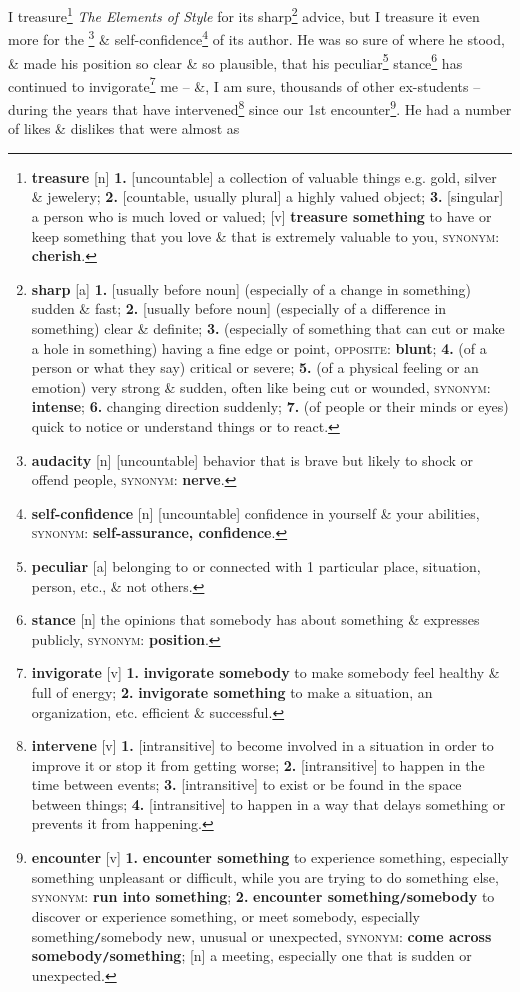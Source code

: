 \documentclass[oneside]{book}
\numberwithin{equation}{section}
\begin{document}
I treasure\footnote{\textbf{treasure} [n] \textbf{1.} [uncountable] a collection of valuable things e.g. gold, silver \& jewelery; \textbf{2.} [countable, usually plural] a highly valued object; \textbf{3.} [singular] a person who is much loved or valued; [v] \textbf{treasure something} to have or keep something that you love \& that is extremely valuable to you, \textsc{synonym}: \textbf{cherish}.} \textit{The Elements of Style} for its sharp\footnote{\textbf{sharp} [a] \textbf{1.} [usually before noun] (especially of a change in something) sudden \& fast; \textbf{2.} [usually before noun] (especially of a difference in something) clear \& definite; \textbf{3.} (especially of something that can cut or make a hole in something) having a fine edge or point, \textsc{opposite}: \textbf{blunt}; \textbf{4.} (of a person or what they say) critical or severe; \textbf{5.} (of a physical feeling or an emotion) very strong \& sudden, often like being cut or wounded, \textsc{synonym}: \textbf{intense}; \textbf{6.} changing direction suddenly; \textbf{7.} (of people or their minds or eyes) quick to notice or understand things or to react.} advice, but I treasure it even more for the \footnote{\textbf{audacity} [n] [uncountable] behavior that is brave but likely to shock or offend people, \textsc{synonym}: \textbf{nerve}.} \& self-confidence\footnote{\textbf{self-confidence} [n] [uncountable] confidence in yourself \& your abilities, \textsc{synonym}: \textbf{self-assurance, confidence}.} of its author.  He was so sure of where he stood, \& made his position so clear \& so plausible, that his peculiar\footnote{\textbf{peculiar} [a] belonging to or connected with 1 particular place, situation, person, etc., \& not others.} stance\footnote{\textbf{stance} [n] the opinions that somebody has about something \& expresses publicly, \textsc{synonym}: \textbf{position}.} has continued to invigorate\footnote{\textbf{invigorate} [v] \textbf{1.} \textbf{invigorate somebody} to make somebody feel healthy \& full of energy; \textbf{2.} \textbf{invigorate something} to make a situation, an organization, etc. efficient \& successful.} me -- \&, I am sure, thousands of other ex-students -- during the years that have intervened\footnote{\textbf{intervene} [v] \textbf{1.} [intransitive] to become involved in a situation in order to improve it or stop it from getting worse; \textbf{2.} [intransitive] to happen in the time between events; \textbf{3.} [intransitive] to exist or be found in the space between things; \textbf{4.} [intransitive] to happen in a way  that delays something or prevents it from happening.} since our 1st encounter\footnote{\textbf{encounter} [v] \textbf{1.} \textbf{encounter something} to experience something, especially something unpleasant or difficult, while you are trying to do something else, \textsc{synonym}: \textbf{run into something}; \textbf{2.} \textbf{encounter something\texttt{/}somebody} to discover or experience something, or meet somebody, especially something\texttt{/}somebody new, unusual or unexpected, \textsc{synonym}: \textbf{come across somebody\texttt{/}something}; [n] a meeting, especially one that is sudden or unexpected.}. He had a number of likes \& dislikes that were almost as 
\end{document}
